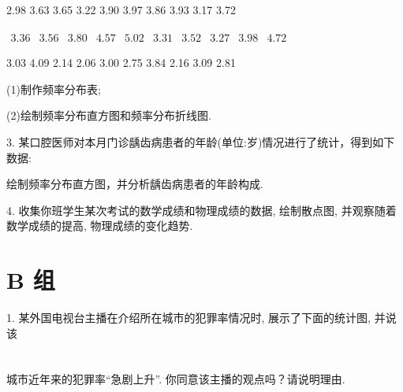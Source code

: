 \documentclass[10pt]{article}
\begin{document}
2.98 3.63 3.65 3.22 3.90 3.97 3.86 3.93 3.17 3.72

\(\begin{array}{llllllllll} {3.36} & {3.56} & {3.80} & {4.57} & {5.02} & {3.31} & {3.52} & {3.27} & {3.98} & {4.72} \end{array}\)

3.03 4.09 2.14 2.06 3.00 2.75 3.84 2.16 3.09 2.81

(1)制作频率分布表;

(2)绘制频率分布直方图和频率分布折线图.

3. 某口腔医师对本月门诊龋齿病患者的年龄(单位:岁)情况进行了统计，得到如下数据:

\begin{center}
\adjustbox{max width=\textwidth}{
\begin{tabular}{|c|c|}
\hline
年龄分组区间 & 患者人数 \\
\cline{1-2}
\(\lbrack 0,{10})\) & 7 \\
\cline{1-2}
\(\lbrack {10},{20})\) & 35 \\
\cline{1-2}
\(\lbrack {20},{30})\) & 34 \\
\cline{1-2}
[30,40) & 46 \\
\cline{1-2}
[40,50) & 39 \\
\cline{1-2}
[50,60) & 30 \\
\cline{1-2}
[60,70) & 12 \\
\cline{1-2}
[70,80] & 3 \\
\cline{1-2}
合计 & 206 \\
\cline{1-2}
\hline
\end{tabular}
}
\end{center}

绘制频率分布直方图，并分析龋齿病患者的年龄构成.

4. 收集你班学生某次考试的数学成绩和物理成绩的数据, 绘制散点图, 并观察随着数学成绩的提高, 物理成绩的变化趋势.

\section*{B 组}

1. 某外国电视台主播在介绍所在城市的犯罪率情况时, 展示了下面的统计图, 并说该



\section*{}

城市近年来的犯罪率“急剧上升”. 你同意该主播的观点吗？请说明理由.
\end{document}
